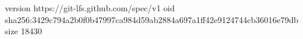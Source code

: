 version https://git-lfs.github.com/spec/v1
oid sha256:3429c794a2b0f0b47997ca984d59ab2884a697a1ff42e9124744cb36016e79db
size 18430
